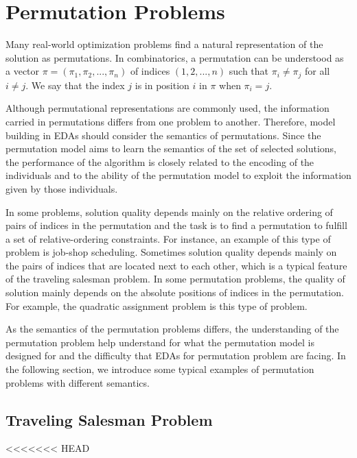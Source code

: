 \section{Permutation Problems}
\label{ch:permutation_problems}


Many real-world optimization problems find a natural representation of the solution as permutations. In combinatorics, a permutation can be understood as a vector $\pi = (\pi_1, \pi_2,...,\pi_n)$ of indices $(1,2,...,n)$ such that $\pi_i \neq \pi_j$ for all $i \neq j$. We say that the index $j$ is in position $i$ in $\pi$ when $\pi_i = j$.

Although permutational representations are commonly used, the information carried in permutations differs from one problem to another. Therefore, model building in EDAs should consider  the semantics of permutations. Since the permutation model aims to learn the semantics of the set of selected solutions, the performance of the algorithm is closely related to the encoding of the individuals and to the ability of the permutation model to exploit the information given by those individuals.

In some problems, solution quality depends mainly on the relative ordering of pairs of indices in the permutation and the task is to find a permutation to fulfill a set of relative-ordering constraints. For instance, an example of this type of problem is job-shop scheduling. Sometimes solution quality depends mainly on the pairs of indices that are located next to each other, which is a typical feature of the traveling salesman problem. In some permutation problems, the quality of solution mainly depends on the absolute positions of indices in the permutation. For example, the quadratic assignment problem is this type of problem.

As the semantics of the permutation problems differs, the understanding of the permutation problem  help understand for what the permutation model is designed for and the difficulty that EDAs for permutation problem are facing. In the following section, we introduce some typical examples of permutation problems with different semantics.

\subsection{Traveling Salesman Problem}
<<<<<<< HEAD

